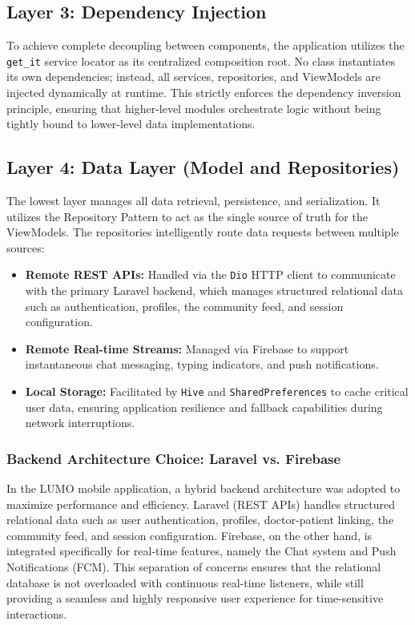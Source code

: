 \documentclass[12pt,a4paper]{report}
\begin{document}
\subsection{Layer 3: Dependency Injection}
To achieve complete decoupling between components, the application utilizes the \texttt{get\_it} service locator as its centralized composition root. No class instantiates its own dependencies; instead, all services, repositories, and ViewModels are injected dynamically at runtime. This strictly enforces the dependency inversion principle, ensuring that higher-level modules orchestrate logic without being tightly bound to lower-level data implementations.

\subsection{Layer 4: Data Layer (Model and Repositories)}
The lowest layer manages all data retrieval, persistence, and serialization. It utilizes the Repository Pattern to act as the single source of truth for the ViewModels. The repositories intelligently route data requests between multiple sources:
\begin{itemize}
    \item \textbf{Remote REST APIs:} Handled via the \texttt{Dio} HTTP client to communicate with the primary Laravel backend, which manages structured relational data such as authentication, profiles, the community feed, and session configuration.
    \item \textbf{Remote Real-time Streams:} Managed via Firebase to support instantaneous chat messaging, typing indicators, and push notifications.
    \item \textbf{Local Storage:} Facilitated by \texttt{Hive} and \texttt{SharedPreferences} to cache critical user data, ensuring application resilience and fallback capabilities during network interruptions.
\end{itemize}

\subsubsection*{Backend Architecture Choice: Laravel vs. Firebase}
In the LUMO mobile application, a hybrid backend architecture was adopted to maximize performance and efficiency. Laravel (REST APIs) handles structured relational data such as user authentication, profiles, doctor-patient linking, the community feed, and session configuration. Firebase, on the other hand, is integrated specifically for real-time features, namely the Chat system and Push Notifications (FCM). This separation of concerns ensures that the relational database is not overloaded with continuous real-time listeners, while still providing a seamless and highly responsive user experience for time-sensitive interactions.
\end{document}
